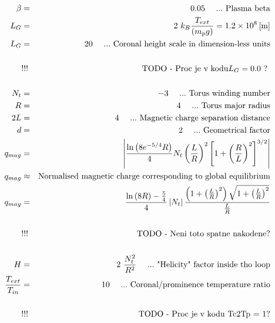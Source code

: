 \begin{eqnarray}
\beta & = & 0.05\ \ \ \ ...\ \text{Plasma beta}\\
L_G & = & 2\ k_B \frac{T_{ext}}{\lo m_p g \ro} = 1.2 \times 10^8 \left[\text{m}\right]\\
L_G & = & 20 \ \ \ \ ...\ \text{Coronal height scale in dimension-less units}\\
\\
& !!! & \text{TODO - Proc je v kodu} L_G = 0.0 \ ?\
\\ \\
N_t & = &-3\ \ \ \ ...\ \text{Torus winding number}\\
R & = &4\ \ \ \ ...\ \text{Torus major radius}\\
2L & = & 4\ \ \ \ ...\ \text{Magnetic charge separation distance}\\
d & = & 2\ \ \ \ ...\ \text{Geometrical factor}\\
q_{mag} & = & \left| \frac{\ln\lo 8 e^{-5/4} R\ro}{4} N_t \lo\frac{L}{R}\ro^2\left[1 + \lo\frac{R}{L}\ro^2\right]^{3/2}\right|\\
q_{mag} & \approx & \text{Normalised magnetic charge corresponding to global equilibrium}\\
q_{mag} & = & \frac{ \ln\lo 8R \ro - \frac{5}{4}}{4} \left| N_t \right| \frac{\lo 1 + \lo\frac{L}{R}\ro^2\ro \sqrt{1 + \lo\frac{L}{R}\ro^2}}{\frac{L}{R}}\\
\\
& !!! & \text{TODO - Neni toto spatne nakodene?}
\\\ \\
H & = & 2\ \frac{N_t^2}{R^2}\ \ \ \ ...\ \text{"Helicity" factor inside tho loop}\\
\frac{ T_{ext} }{T_{in}} & = & 10\ \ \ \ ...\ \text{Coronal/prominence temperature ratio}\\
\\
& !!! & \text{TODO - Proc je v kodu Tc2Tp = 1?}
\\\ \\
\end{eqnarray}